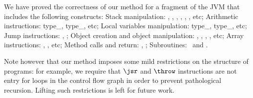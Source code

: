 


We have proved the correctness of our method for a fragment of the JVM
that includes the following constructs: Stack manipulation: \push,
\pop, \dup, , \swap, \numop, etc; Arithmetic instructions:
type\_\add, type\_\sub, etc; Local variables manipulation:
type\_\load, type\_\store, etc; Jump instructions: \If, \goto; Object
creation and object manipulation: \new, \putfd, \getfd, \newarray,
etc; Array instructions: \arrst, \arrld, etc; Method calls and return:
\invvir, \return; Subroutines: \jsr\ and \ret.

Note however that our method imposes some mild restrictions on the
structure of programs: for example, we require that $\jsr$ and
$\throw$ instructions are not entry for loops in the control flow
graph in order to prevent pathological recursion.  Lifting such
restrictions is left for future work.

